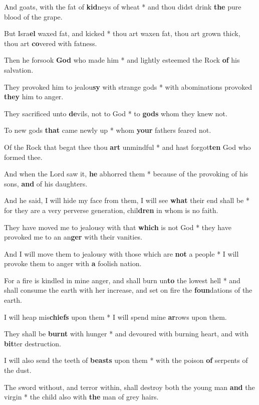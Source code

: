 \begin{multicols}{2}
	And goats, with the fat of \textbf{kid}neys of wheat * and thou didst drink \textbf{the} pure blood of the grape.
	
	But Isra\textbf{el} waxed fat, and kicked * thou art waxen fat, thou art grown thick, thou art \textbf{co}vered with fatness.
	
	Then he forsook \textbf{God} who made him * and lightly esteemed the Rock \textbf{of} his salvation.
	
	They provoked him to jealou\textbf{sy} with strange gods * with abominations provoked \textbf{they} him to anger.
	
	They sacrificed unto \textbf{de}vils, not to God * to \textbf{gods} whom they knew not.
	
	To new gods \textbf{that} came newly up * whom \textbf{your} fathers feared not.
	
	Of the Rock that begat thee thou \textbf{art} unmindful * and hast forgot\textbf{ten} God who formed thee.
	
	And when the Lord saw it, \textbf{he} abhorred them * because of the provoking of his sons, \textbf{and} of his daughters.
	
	And he said, I will hide my face from them, I will see \textbf{what} their end shall be * for they are a very perverse generation, chil\textbf{dren} in whom is no faith.
	
	They have moved me to jealousy with that \textbf{which} is not God * they have provoked me to an an\textbf{ger} with their vanities.
	
	And I will move them to jealousy with those which are \textbf{not} a people * I will provoke them to anger with \textbf{a} foolish nation.
	
	For a fire is kindled in mine anger, and shall burn un\textbf{to} the lowest hell * and shall consume the earth with her increase, and set on fire the \textbf{foun}dations of the earth.
	
	I will heap mis\textbf{chiefs} upon them * I will spend mine \textbf{ar}rows upon them.
	
	They shall be \textbf{burnt} with hunger * and devoured with burning heart, and with \textbf{bit}ter destruction.
	
	I will also send the teeth of \textbf{beasts} upon them * with the poison \textbf{of} serpents of the dust.
	
	The sword without, and terror within, shall destroy both the young man \textbf{and} the virgin * the child also with \textbf{the} man of grey hairs.
	

\end{multicols}
